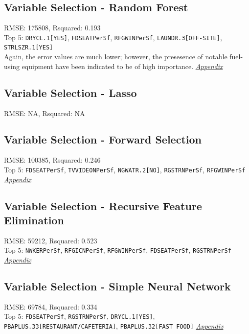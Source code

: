 \subsection{Variable Selection - Random Forest}
RMSE: 175808, Rsquared: 0.193\\
Top 5: \lstinline{DRYCL.1[YES]}, \lstinline{FDSEATPerSf}, \lstinline{RFGWINPerSf}, \lstinline{LAUNDR.3[OFF-SITE]}, \lstinline{STRLSZR.1[YES]} 
\\[0.1in]
Again, the error values are much lower; however, the presesence of notable fuel-using equipment have been indicated to be of high importance. \textit{\hyperref[appendix:natural_gas:rf]{Appendix}}

\subsection{Variable Selection - Lasso}
RMSE: NA, Rsquared: NA\\

\subsection{Variable Selection - Forward Selection}
RMSE: 100385, Rsquared: 0.246\\
Top 5: \lstinline{FDSEATPerSf}, \lstinline{TVVIDEONPerSf}, \lstinline{NGWATR.2[NO]}, \lstinline{RGSTRNPerSf}, \lstinline{RFGWINPerSf}  \textit{\hyperref[appendix:natural_gas:lp]{Appendix}}

\subsection{Variable Selection - Recursive Feature Elimination}
RMSE: 59212, Rsquared: 0.523\\
Top 5: \lstinline{NWKERPerSf}, \lstinline{RFGICNPerSf}, \lstinline{RFGWINPerSf}, \lstinline{FDSEATPerSf}, \lstinline{RGSTRNPerSf}  \textit{\hyperref[appendix:natural_gas:rfe]{Appendix}}

\subsection{Variable Selection - Simple Neural Network}
RMSE: 69784, Rsquared: 0.334\\
Top 5: \lstinline{FDSEATPerSf}, \lstinline{RGSTRNPerSf}, \lstinline{DRYCL.1[YES]}, \lstinline{PBAPLUS.33[RESTAURANT/CAFETERIA]}, \lstinline{PBAPLUS.32[FAST FOOD]}  
\textit{\hyperref[appendix:natural_gas:snn]{Appendix}}

